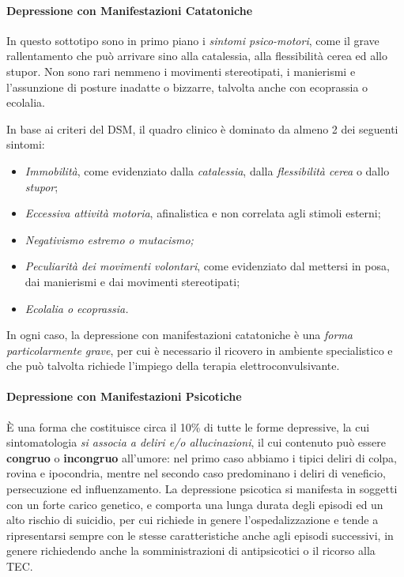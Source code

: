 \paragraph{Depressione con Manifestazioni Catatoniche}
In questo
  sottotipo sono in primo piano i \emph{sintomi psico-motori}, come il
  grave rallentamento che può arrivare sino alla catalessia, alla
  flessibilità cerea ed allo stupor. Non sono rari nemmeno i movimenti
  stereotipati, i manierismi e l'assunzione di posture inadatte o
  bizzarre, talvolta anche con ecoprassia o ecolalia.

  In base ai criteri del DSM, il quadro clinico è dominato da almeno 2
  dei seguenti sintomi:
  
\begin{itemize}
\item
  \emph{Immobilità}, come evidenziato dalla \emph{catalessia}, dalla
  \emph{flessibilità cerea} o dallo \emph{stupor};
\item
  \emph{Eccessiva attività motoria}, afinalistica e non correlata agli
  stimoli esterni;
\item
  \emph{Negativismo estremo o mutacismo;}
\item
  \emph{Peculiarità dei movimenti volontari}, come evidenziato dal
  mettersi in posa, dai manierismi e dai movimenti stereotipati;
\item
  \emph{Ecolalia o ecoprassia.}
\end{itemize}

In ogni caso, la depressione con manifestazioni catatoniche è una
\emph{forma particolarmente grave}, per cui è necessario il ricovero in
ambiente specialistico e che può talvolta richiede l'impiego della
terapia elettroconvulsivante.

\paragraph{Depressione con Manifestazioni Psicotiche}
È una forma
  che costituisce circa il 10\% di tutte le forme depressive, la cui
  sintomatologia \emph{si associa a deliri e/o allucinazioni}, il cui
  contenuto può essere \textbf{congruo} o \textbf{incongruo} all'umore:
  nel primo caso abbiamo i tipici deliri di colpa, rovina e ipocondria,
  mentre nel secondo caso predominano i deliri di veneficio,
  persecuzione ed influenzamento. La depressione psicotica si manifesta
  in soggetti con un forte carico genetico, e comporta una lunga durata
  degli episodi ed un alto rischio di suicidio, per cui richiede in
  genere l'ospedalizzazione e tende a ripresentarsi sempre con le stesse
  caratteristiche anche agli episodi successivi, in genere richiedendo
  anche la somministrazioni di antipsicotici o il ricorso alla TEC.


